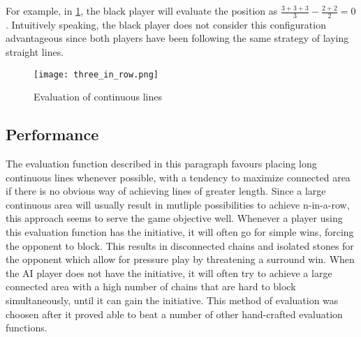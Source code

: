 For example, in \ref{fig:tree_in_row}, the black player will evaluate the position as $\frac{3 + 3 + 3}{3} - \frac{2 + 2}{2} = 0$. Intuitively speaking, the black player does not consider this configuration advantageous since both players have been following the same strategy of laying straight lines.
\begin{figure}[H]
    \centering
    \texttt{[image: three\_in\_row.png]}
    \caption{Evaluation of continuous lines}
    \label{fig:tree_in_row}
\end{figure}



\subsection{Performance}
 The evaluation function described in this paragraph favours placing long continuous lines whenever possible, with a tendency to maximize connected area if there is no obvious way of achieving lines of greater length. Since a large continuous area will usually result in mutliple possibilities to achieve n-in-a-row, this approach seems to serve the game objective well. Whenever a player using this evaluation function has the initiative, it will often go for simple wins, forcing the opponent to block. This results in disconnected chains and isolated stones for the opponent which allow for pressure play by threatening a surround win. When the AI player does not have the initiative, it will often try to achieve a large connected area with a high number of chains that are hard to block simultaneously, until it can gain the initiative. This method of evaluation was choosen after it proved able to beat a number of other hand-crafted evaluation functions.